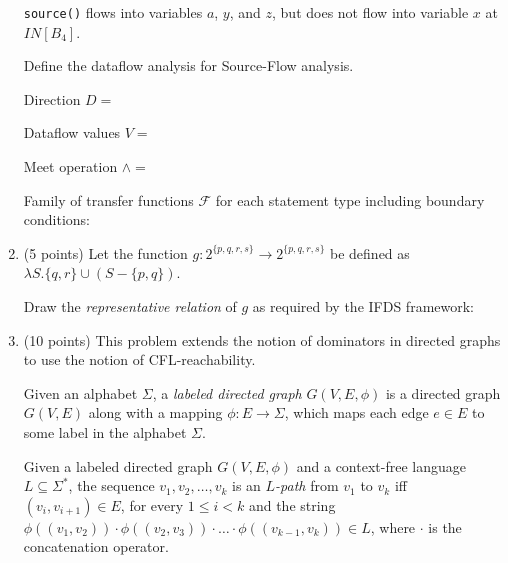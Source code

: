 \documentclass[12pt]{article}
\begin{document}
\begin{enumerate}
\begin{center}
    \end{center}

      \lstinline$source()$ flows into variables $a$, $y$, and $z$, but does not
      flow into variable $x$ at $IN[B_4]$.

      Define the dataflow analysis for Source-Flow analysis.

      \begin{mdframed}
        Direction $D =$  %

        Dataflow values $V = $  %

        Meet operation $\wedge = $ %

        Family of transfer functions $\mathcal{F}$ for each statement type
        including boundary conditions:  %

      \end{mdframed}

      \item (5 points) Let the function $g: 2^{\{p,q,r, s\}} \rightarrow 2^{\{p,q,r,s\}}$ be defined 
      as $\lambda S. \{q, r\} \cup (S - \{p, q \})$. 
    
      Draw the \emph{representative relation} of $g$ as required by the IFDS framework:
    
      \begin{mdframed}
        \vspace{5em}
        
      \end{mdframed}

      \clearpage
      \item (10 points) This problem extends the notion of dominators in
      directed graphs to use the notion of CFL-reachability.

      Given an alphabet $\Sigma$, a \emph{labeled directed graph} $G(V, E, \phi)$ is a
      directed graph $G(V, E)$  along with a mapping $\phi \colon E \to \Sigma$,
      which maps each edge $e\in E$ to some label in the alphabet $\Sigma$. 

      Given a labeled directed graph $G(V, E, \phi)$ and a context-free language
      $L \subseteq \Sigma^*$, the sequence $v_1, v_2, \ldots, v_k$ is an
      \emph{$L$-path} from $v_1$ to $v_k$ iff $(v_i,v_{i+1}) \in E$, for every
      $1\leq i < k$ and the string $\phi((v_1, v_2)) \cdot \phi((v_2, v_3)) \cdot \ldots \cdot
      \phi((v_{k-1},v_k)) \in L$, where $\cdot$ is the concatenation operator. 


\end{enumerate}
\end{document}
